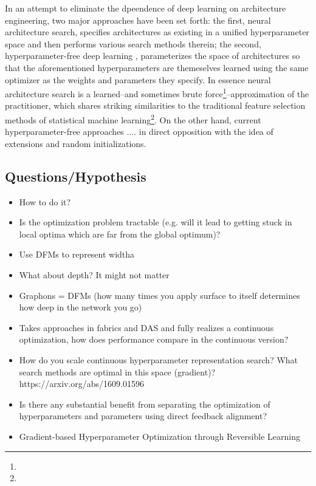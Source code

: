 \documentclass[12pt]{article}
\begin{document}
In an attempt to eliminate the dpeendence of deep learning on architecture engineering, two major approaches have been set forth: the first, neural architecture search, specifies architectures as existing in a unified hyperparameter space and then performs various search methods therein; the second, hyperparameter-free deep learning , parameterizes the space of architectures so that the aforementioned hyperparameters are themeselves learned using the same optimizer as the weights and parameters they specify. In essence neural architecture search is a learned--and sometimes brute force\footnote{}--approximation of the practitioner, which shares striking similarities to the traditional feature selection methods of statistical machine learning\footnote{}. On the other hand, current hyperparameter-free approaches .... in direct opposition with the idea of extensions and random initializations. 





\subsection{Questions/Hypothesis}
\begin{itemize}
\item How to do it?
\item Is the optimization problem tractable (e.g. will it lead to getting stuck in local optima which are far from the global optimum)?
\item Use DFMs to represent widtha
\item What about depth? It might not matter
\item Graphons = DFMs (how many times you apply surface to itself determines how deep in the network you go)
\item Takes approaches in fabrics and DAS and fully realizes a continuous optimization, how does performance compare in the continuous version?
\item How do you scale continuous hyperparameter representation search? What search methods are optimal in this space (gradient)?  https://arxiv.org/abs/1609.01596 
\item Is there any substantial benefit from separating the optimization of hyperparameters and parameters using direct feedback alignment?
\item Gradient-based Hyperparameter Optimization through Reversible Learning
\end{itemize}
\end{document}
